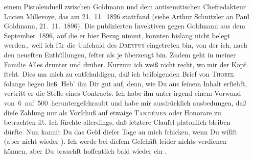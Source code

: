 \begin{ledgroupsized}[t]{13cm}
{{{                  einem Pistolenduell zwischen Goldmann und
                  dem antisemitischen Chefredakteur Lucien
                     Millevoye, das am 21. 11. 1896 stattfand (siehe Arthur Schnitzler an Paul Goldmann, 21. 11. 1896). Die publizierten
                  Invektiven gegen Goldmann aus dem September 1896, auf die er hier Bezug nimmt, konnten
                  bislang nicht belegt werden.}}}\label{K_L02785-1h}, weil ich \strikeout{\textcolor{gray}{von}} für die Unſchuld des \textsc{Dreyfus} eingetreten bin, von der ich, nach den neueſten Enthüllungen, feſter als je
               überzeugt bin. Zudem geht in meiner Familie Alles drunter und drüber. Kurzum ich weiß
               nicht recht, wo mir {\pb}der Kopf ſteht.\pend
           \pstart
           Dies um mich zu entſchuldigen, daß ich  beifolgenden
               Brief von \textsc{Thorel} ſolange liegen ließ. Heb’ ihn Dir gut auf, denn, wie Du aus ſeinem Inhalt
               erſiehſt, vertritt er die Stelle eines Contracts. Ich habe ihn unter irgend einem
               Vorwand von 6 auf 500 heruntergeſchraubt und habe mir ausdrücklich ausbedungen, daß
               dieſe Zahlung nur als Vorſchuß auf etwaige {\pb}\strikeout{\textcolor{gray}{×}}{ }\textsc{Tantièmen} oder Honorare zu betrachten iſt. Ich fürchte
               allerdings, daß letztere Clauſel platoniſch bleiben dürfte. Nun kannſt Du das Geld
               dieſer Tage an mich ſchicken, wenn Du willſt (aber nicht wieder \label{K_L02785-2v}\label{K_L02785-2h}). Ich werde bei dieſem Geſchäft leider nichts verdienen können, aber Du
               brauchſt hoffentlich bald wieder ein \label{K_L02785-3v}\label{K_L02785-3h}.\pend

\end{ledgroupsized}
